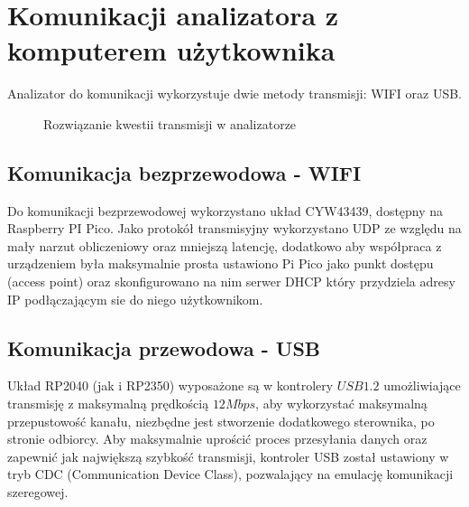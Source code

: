 \section{Komunikacji analizatora z komputerem użytkownika}
Analizator do komunikacji wykorzystuje dwie metody transmisji: WIFI oraz USB.

\begin{figure}[ht]
    \centering
    \caption{Rozwiązanie kwestii transmisji w analizatorze}
    \label{fig:udp-komunikacja}
\end{figure}

\subsection{Komunikacja bezprzewodowa - WIFI}
    Do komunikacji bezprzewodowej wykorzystano układ CYW43439, dostępny na Raspberry PI Pico. 
    Jako protokół transmisyjny wykorzystano UDP ze względu na mały narzut
    obliczeniowy oraz mniejszą latencję, dodatkowo aby współpraca z urządzeniem była maksymalnie prosta ustawiono Pi Pico
    jako punkt dostępu (access point) oraz skonfigurowano na nim serwer DHCP który przydziela adresy
    IP podłączającym sie do niego użytkownikom. 

\subsection{Komunikacja przewodowa - USB}
    Układ RP2040 (jak i RP2350) wyposażone są w kontrolery $USB 1.2$ umożliwiające transmisję z maksymalną prędkością $12Mbps$,
    aby wykorzystać maksymalną przepustowość kanału, niezbędne jest stworzenie dodatkowego sterownika, po stronie odbiorcy.
    Aby maksymalnie uprościć proces przesyłania danych oraz zapewnić jak największą szybkość transmisji, kontroler USB został ustawiony w tryb CDC (Communication Device Class),
    pozwalający na emulację komunikacji szeregowej.

